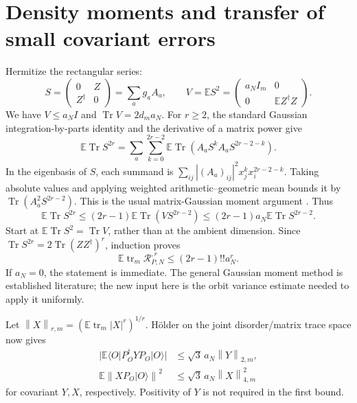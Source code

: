 \documentclass[11pt]{article}
\newcommand{\E}{\mathbb E}
\newcommand{\Tr}{\operatorname{Tr}}
\newcommand{\tr}{\operatorname{tr}}
\newcommand{\norm}[1]{\left\lVert#1\right\rVert}
\begin{document}
\newpage
\section{Density moments and transfer of small covariant errors}
Hermitize the rectangular series:
\begin{equation}
 S=\begin{pmatrix}0&Z\\Z^\dagger&0\end{pmatrix}
   =\sum_a g_a A_a,\qquad
 V=\E S^2=\begin{pmatrix}a_N I_m&0\\0&\E Z^\dagger Z\end{pmatrix}.
\end{equation}
We have $V\le a_NI$ and $\Tr V=2d_m a_N$. For $r\ge2$, the
standard Gaussian integration-by-parts identity \cite[Sec.~6]{Tropp}
and the derivative of a matrix power give
\begin{equation}
 \E\Tr S^{2r}
 =\sum_a\sum_{k=0}^{2r-2}
     \E\Tr(A_aS^kA_aS^{2r-2-k}).
\end{equation}
In the eigenbasis of $S$, each summand is
$\sum_{ij}|(A_a)_{ij}|^2 x_j^k x_i^{2r-2-k}$.
Taking absolute values and applying weighted arithmetic--geometric
mean bounds it by $\Tr(A_a^2 S^{2r-2})$. This is the usual
matrix-Gaussian moment argument \cite[Sec.~7]{Tropp}. Thus
\begin{equation}
 \E\Tr S^{2r}\le(2r-1)\E\Tr(VS^{2r-2})
     \le(2r-1)a_N\E\Tr S^{2r-2}.
\end{equation}
Start at $\E\Tr S^2=\Tr V$, rather than at the ambient dimension.
Since $\Tr S^{2r}=2\Tr(ZZ^\dagger)^r$, induction proves
\begin{equation}\label{eq:moment}
 \E\tr_m\mathcal R_{P,N}^{,r}\le(2r-1)!!a_N^r.
\end{equation}
If $a_N=0$, the statement is immediate. The general Gaussian moment
method is established literature; the new input here is the orbit
variance estimate needed to apply it uniformly.

Let $\norm X_{r,m}=(\E\tr_m|X|^r)^{1/r}$. H\"older on the joint
disorder/matrix trace space now gives
\begin{align}\label{eq:holder}
 |\E\langle O|P_O^\dagger YP_O|O\rangle|
   &\le\sqrt3\,a_N\norm Y_{2,m},\\
 \E\norm{X P_O|O\rangle}^2
   &\le\sqrt3\,a_N\norm X_{4,m}^2
\end{align}
for covariant $Y,X$, respectively. Positivity of $Y$ is not required
in the first bound.
\end{document}
